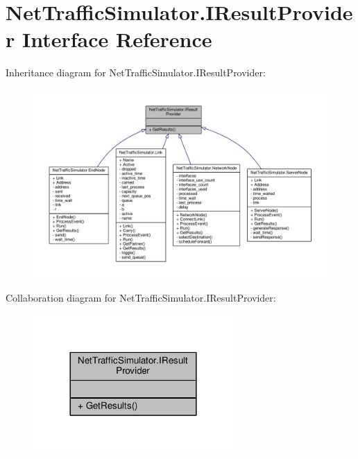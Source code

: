 \hypertarget{interfaceNetTrafficSimulator_1_1IResultProvider}{\section{Net\-Traffic\-Simulator.\-I\-Result\-Provider Interface Reference}
\label{interfaceNetTrafficSimulator_1_1IResultProvider}
}


Inheritance diagram for Net\-Traffic\-Simulator.\-I\-Result\-Provider\-:
\nopagebreak
\begin{figure}[H]
\begin{center}
\leavevmode
\includegraphics[width=350pt]{interfaceNetTrafficSimulator_1_1IResultProvider__inherit__graph}
\end{center}
\end{figure}


Collaboration diagram for Net\-Traffic\-Simulator.\-I\-Result\-Provider\-:
\nopagebreak
\begin{figure}[H]
\begin{center}
\leavevmode
\includegraphics[width=216pt]{interfaceNetTrafficSimulator_1_1IResultProvider__coll__graph}
\end{center}
\end{figure}
